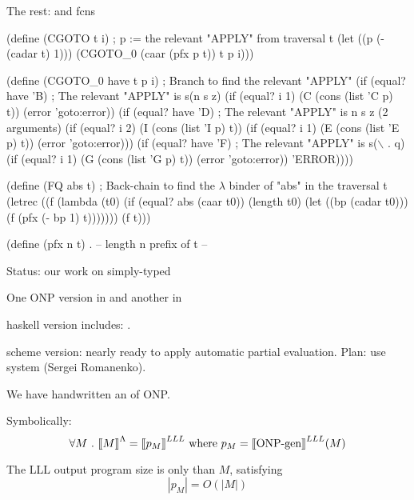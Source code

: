 \documentclass[12pt,fleqn,landscape]{article}
\begin{document}
\begin{slide}{The rest:   and  fcns}

\vspace{-3mm}
\bp
(define (CGOTO t i)    ;  p :=  the relevant "APPLY" from traversal t
      (let ((p (- (cadar t) 1))) (CGOTO_0 (caar (pfx p t)) t p i)))

(define (CGOTO_0 have t p i)                    ; Branch to find the relevant "APPLY"
    (if (equal? have 'B)    ; The relevant "APPLY" is s(n s z)
      (if (equal? i 1) (C (cons (list 'C p) t)) (error 'goto:error))
      (if (equal? have 'D)  ; The relevant "APPLY" is n s z (2 arguments)
        (if (equal? i 2)
          (I (cons (list 'I p) t))
          (if (equal? i 1) (E (cons (list 'E p) t)) (error 'goto:error)))
        (if (equal? have 'F)                    ; The relevant "APPLY" is s($\backslash$ . q)
          (if (equal? i 1) (G (cons (list 'G p) t)) (error 'goto:error))
          'ERROR))))
              
  (define (FQ abs t)  ;  Back-chain to find the $\lambda$ binder of "abs" in the traversal t 
    (letrec ((f
              (lambda (t0)
                (if (equal? abs (caar t0))
                  (length t0)
                  (let ((bp (cadar t0))) (f (pfx (- bp 1) t)))))))
      (f t)))
      
  (define (pfx n t) . -- length n prefix of t --
 \ep
\end{slide}


\begin{slide}{Status: our work on simply-typed \lc }

\be

\item One ONP version in   and another in 
\vair

\item {\sc haskell} version includes: .
\vair

\item {\sc scheme} version: nearly ready to apply automatic partial evaluation. Plan: use   system (Sergei Romanenko).
\vair

\item We have   handwritten an  of ONP. 

Symbolically:
$$
\forall M \ .\ \mbox{$\lbrack\hspace{-0.3ex}\lbrack$} M\mbox{$\rbrack\hspace{-0.3ex}\rbrack$}^\Lambda =  \mbox{$\lbrack\hspace{-0.3ex}\lbrack$} p_M \mbox{$\rbrack\hspace{-0.3ex}\rbrack$}^{LLL} 
\mbox{\ where\ }
p_M = \mbox{$\lbrack\hspace{-0.3ex}\lbrack$} \mbox{ONP-gen} \mbox{$\rbrack\hspace{-0.3ex}\rbrack$}^{LLL} (M)
$$
\vair

\item The LLL output program size  is only  than $M$, satisfying 
$$|p_M| = O(|M|)$$

\ee

\end{slide}
\end{document}
